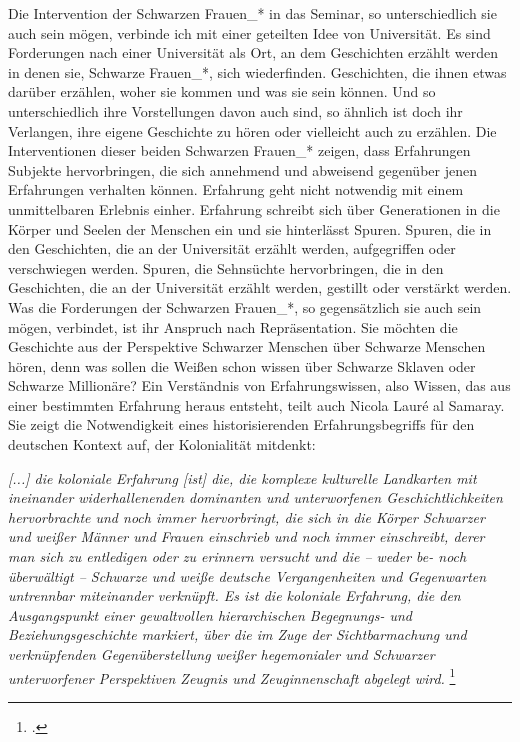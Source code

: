\documentclass[11pt]{article}
\newenvironment{myenv}{\begin{adjustwidth}{2cm}{}}{\end{adjustwidth}}
\begin{document}
Die Intervention der Schwarzen Frauen\_* in das Seminar, so unterschiedlich sie
auch sein mögen, verbinde ich mit einer geteilten Idee von Universität. Es sind
Forderungen nach einer Universität als Ort, an dem Geschichten erzählt werden in
denen sie, Schwarze Frauen\_*, sich wiederfinden. Geschichten, die ihnen etwas
darüber erzählen, woher sie kommen und was sie sein können. Und so
unterschiedlich ihre Vorstellungen davon auch sind, so ähnlich ist doch ihr
Verlangen, ihre eigene Geschichte zu hören oder vielleicht auch zu erzählen.
Die Interventionen dieser beiden Schwarzen Frauen\_* zeigen, dass Erfahrungen
Subjekte hervorbringen, die sich annehmend und abweisend gegenüber jenen
Erfahrungen verhalten können. Erfahrung geht nicht notwendig mit einem
unmittelbaren Erlebnis einher. Erfahrung schreibt sich über Generationen in die
Körper und Seelen der Menschen ein und sie hinterlässt Spuren.  Spuren, die in
den Geschichten, die an der Universität erzählt werden, aufgegriffen oder
verschwiegen werden. Spuren, die Sehnsüchte hervorbringen, die in den
Geschichten, die an der Universität erzählt werden, gestillt oder verstärkt
werden. Was die Forderungen der Schwarzen Frauen\_*, so gegensätzlich sie auch
sein mögen, verbindet, ist ihr Anspruch nach Repräsentation. Sie möchten die
Geschichte aus der Perspektive Schwarzer Menschen über Schwarze Menschen hören,
denn was sollen die Weißen schon wissen über Schwarze Sklaven oder Schwarze
Millionäre?  Ein Verständnis von Erfahrungswissen, also Wissen, das aus einer
bestimmten Erfahrung heraus entsteht, teilt auch Nicola Lauré al Samaray. Sie
zeigt die Notwendigkeit eines historisierenden Erfahrungsbegriffs für den
deutschen Kontext auf, der Kolonialität mitdenkt:

\begin{myenv} \textit{[...] die koloniale Erfahrung [ist] die, die komplexe
    kulturelle Landkarten mit ineinander widerhallenenden dominanten und
    unterworfenen Geschichtlichkeiten hervorbrachte und noch immer hervorbringt,
    die sich in die Körper Schwarzer und weißer Männer und Frauen einschrieb und
    noch immer einschreibt, derer man sich zu entledigen oder zu erinnern versucht
    und die – weder be- noch überwältigt – Schwarze und weiße deutsche
    Vergangenheiten und Gegenwarten untrennbar miteinander verknüpft. Es ist die
    koloniale Erfahrung, die den Ausgangspunkt einer gewaltvollen hierarchischen
    Begegnungs- und Beziehungsgeschichte markiert, über die im Zuge der
    Sichtbarmachung und verknüpfenden Gegenüberstellung weißer hegemonialer und
    Schwarzer unterworfener Perspektiven Zeugnis und Zeuginnenschaft abgelegt
wird.} \footnotemark \footcitetext{masken} \end{myenv}
\end{document}
